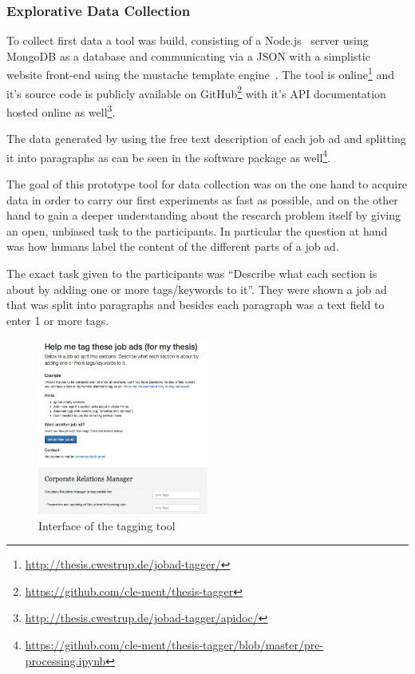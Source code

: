 \subsubsection{Explorative Data Collection}


To collect first data a tool was build, consisting of a Node.js~\cite{nodejs} server using MongoDB\cite{mongodb} as a database and communicating via a JSON with a simplistic website front-end using the mustache template engine~\cite{mustache}. The tool is online\footnote{\url{http://thesis.cwestrup.de/jobad-tagger/}} and it's source code is publicly available on GitHub\footnote{\url{https://github.com/cle-ment/thesis-tagger}} with it's API documentation hosted online as well\footnote{\url{http://thesis.cwestrup.de/jobad-tagger/apidoc/}}.

The data generated by using the free text description of each job ad and splitting it into paragraphs as can be seen in the software package as well\footnote{\url{https://github.com/cle-ment/thesis-tagger/blob/master/pre-processing.ipynb}}.

The goal of this prototype tool for data collection was on the one hand to acquire data in order to carry our first experiments as fast as possible, and on the other hand to gain a deeper understanding about the research problem itself by giving an open, unbiased task to the participants. In particular the question at hand was how humans label the content of the different parts of a job ad.

The exact task given to the participants was ``Describe what each section is about by adding one or more tags/keywords to it''. They were shown a job ad that was split into paragraphs and besides each paragraph was a text field to enter 1 or more tags.

\begin{figure}[h]
  \centering
  \includegraphics[width=0.5\textwidth]{img/thesis-tagger-interface.png}
  \caption{Interface of the tagging tool}
\label{fig:thesis-tagger-interface}
\end{figure}

